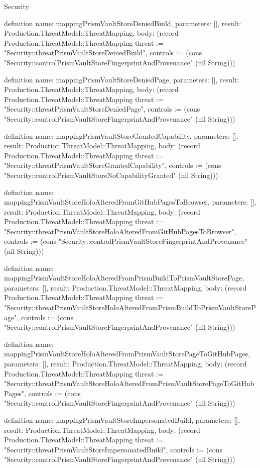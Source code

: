 \begin{lexlean}{Security}
\begin{semanticmodule}
definition{
  name: mappingPrismVaultStoreDeniedBuild,
  parameters: [],
  result: Production.ThreatModel::ThreatMapping,
  body: (record Production.ThreatModel::ThreatMapping {threat := "Security::threatPrismVaultStoreDeniedBuild", controls := (cons "Security::controlPrismVaultStoreFingerprintAndProvenance" (nil String))})
}

definition{
  name: mappingPrismVaultStoreDeniedPage,
  parameters: [],
  result: Production.ThreatModel::ThreatMapping,
  body: (record Production.ThreatModel::ThreatMapping {threat := "Security::threatPrismVaultStoreDeniedPage", controls := (cons "Security::controlPrismVaultStoreFingerprintAndProvenance" (nil String))})
}

definition{
  name: mappingPrismVaultStoreGrantedCapability,
  parameters: [],
  result: Production.ThreatModel::ThreatMapping,
  body: (record Production.ThreatModel::ThreatMapping {threat := "Security::threatPrismVaultStoreGrantedCapability", controls := (cons "Security::controlPrismVaultStoreNoCapabilityGranted" (nil String))})
}

definition{
  name: mappingPrismVaultStoreHoloAlteredFromGitHubPagesToBrowser,
  parameters: [],
  result: Production.ThreatModel::ThreatMapping,
  body: (record Production.ThreatModel::ThreatMapping {threat := "Security::threatPrismVaultStoreHoloAlteredFromGitHubPagesToBrowser", controls := (cons "Security::controlPrismVaultStoreFingerprintAndProvenance" (nil String))})
}

definition{
  name: mappingPrismVaultStoreHoloAlteredFromPrismBuildToPrismVaultStorePage,
  parameters: [],
  result: Production.ThreatModel::ThreatMapping,
  body: (record Production.ThreatModel::ThreatMapping {threat := "Security::threatPrismVaultStoreHoloAlteredFromPrismBuildToPrismVaultStorePage", controls := (cons "Security::controlPrismVaultStoreFingerprintAndProvenance" (nil String))})
}

definition{
  name: mappingPrismVaultStoreHoloAlteredFromPrismVaultStorePageToGitHubPages,
  parameters: [],
  result: Production.ThreatModel::ThreatMapping,
  body: (record Production.ThreatModel::ThreatMapping {threat := "Security::threatPrismVaultStoreHoloAlteredFromPrismVaultStorePageToGitHubPages", controls := (cons "Security::controlPrismVaultStoreFingerprintAndProvenance" (nil String))})
}

definition{
  name: mappingPrismVaultStoreImpersonatedBuild,
  parameters: [],
  result: Production.ThreatModel::ThreatMapping,
  body: (record Production.ThreatModel::ThreatMapping {threat := "Security::threatPrismVaultStoreImpersonatedBuild", controls := (cons "Security::controlPrismVaultStoreFingerprintAndProvenance" (nil String))})
}


\end{semanticmodule}
\end{lexlean}
